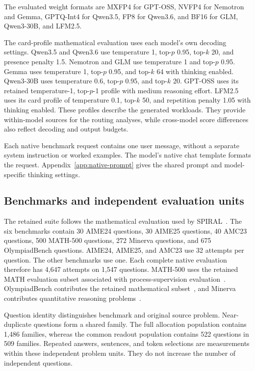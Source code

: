 The evaluated weight formats are MXFP4 for GPT-OSS, NVFP4 for Nemotron and Gemma, GPTQ-Int4 for Qwen3.5, FP8 for Qwen3.6, and BF16 for GLM, Qwen3-30B, and LFM2.5.
%

The card-profile mathematical evaluation uses each model's own decoding settings.
%
Qwen3.5 and Qwen3.6 use temperature 1, top-$p$ 0.95, top-$k$ 20, and presence penalty 1.5.
%
Nemotron and GLM use temperature 1 and top-$p$ 0.95.
%
Gemma uses temperature 1, top-$p$ 0.95, and top-$k$ 64 with thinking enabled.
%
Qwen3-30B uses temperature 0.6, top-$p$ 0.95, and top-$k$ 20.
%
GPT-OSS uses its retained temperature-1, top-$p$-1 profile with medium reasoning effort.
%
LFM2.5 uses its card profile of temperature 0.1, top-$k$ 50, and repetition penalty 1.05 with thinking enabled.
%
These profiles describe the generated workloads.
%
They provide within-model sources for the routing analyses, while cross-model score differences also reflect decoding and output budgets.
%

Each native benchmark request contains one user message, without a separate system instruction or worked examples.
%
The model's native chat template formats the request.
%
Appendix~\ref{app:native-prompt} gives the shared prompt and model-specific thinking settings.
%

\subsection{Benchmarks and independent evaluation units}

The retained suite follows the mathematical evaluation used by SPIRAL~\citep{liu2025spiral}.
%
The six benchmarks contain 30 AIME24 questions, 30 AIME25 questions, 40 AMC23 questions, 500 MATH-500 questions, 272 Minerva questions, and 675 OlympiadBench questions.
%
AIME24, AIME25, and AMC23 use 32 attempts per question.
%
The other benchmarks use one.
%
Each complete native evaluation therefore has 4,647 attempts on 1,547 questions.
%
MATH-500 uses the retained MATH evaluation subset associated with process-supervision evaluation~\citep{lightman2024verify}.
%
OlympiadBench contributes the retained mathematical subset~\citep{he2024olympiadbench}, and Minerva contributes quantitative reasoning problems~\citep{lewkowycz2022minerva}.
%

Question identity distinguishes benchmark and original source problem.
%
Near-duplicate questions form a shared family.
%
The full allocation population contains 1,486 families, whereas the common readout population contains 522 questions in 509 families.
%
Repeated answers, sentences, and token selections are measurements within these independent problem units.
%
They do not increase the number of independent questions.
%


